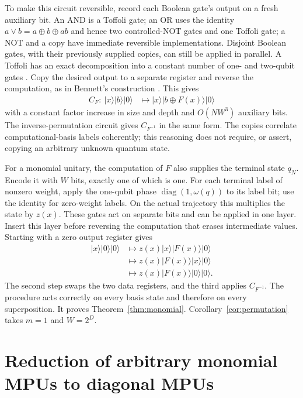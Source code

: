 \documentclass[11pt]{article}
\begin{document}
To make this circuit reversible, record each Boolean gate's output on a
fresh auxiliary bit. An AND is a Toffoli gate; an OR uses the identity
$a\lor b=a\oplus b\oplus ab$ and hence two controlled-NOT gates and one
Toffoli gate; a NOT and a copy have immediate reversible implementations.
Disjoint Boolean gates, with their previously supplied copies, can still
be applied in parallel. A Toffoli has an exact decomposition into a constant
number of one- and two-qubit gates \cite{Barenco95}.
Copy the desired output to a separate register and reverse the computation,
as in Bennett's construction \cite{Bennett73}. This gives
\begin{align}
 C_F:\ |x\rangle|b\rangle|0\rangle
 &\longmapsto |x\rangle|b\oplus F(x)\rangle|0\rangle
 \label{eq:reversible}
\end{align}
with a constant factor increase in size and depth and $O(NW^3)$ auxiliary
bits. The inverse-permutation circuit gives $C_{F^{-1}}$ in the same form.
The copies correlate computational-basis labels coherently; this reasoning
does not require, or assert, copying an arbitrary unknown quantum state.

For a monomial unitary, the computation of $F$ also supplies the terminal
state $q_N$. Encode it with $W$ bits, exactly one of which is one. For each
terminal label of nonzero weight, apply the one-qubit phase
$\operatorname{diag}(1,\omega(q))$ to its label bit; use the identity for
zero-weight labels. On the actual trajectory this multiplies the state by
$z(x)$. These gates act on separate bits and can be applied in one layer.
Insert this layer before reversing the computation that erases intermediate
values. Starting with a zero output register gives
\begin{align}
 |x\rangle|0\rangle|0\rangle
 &\longmapsto z(x)|x\rangle|F(x)\rangle|0\rangle\\
 &\longmapsto z(x)|F(x)\rangle|x\rangle|0\rangle\\
 &\longmapsto z(x)|F(x)\rangle|0\rangle|0\rangle.
 \label{eq:clean}
\end{align}
The second step swaps the two data registers, and the third applies
$C_{F^{-1}}$. The procedure acts correctly on every basis state and therefore
on every superposition. It proves Theorem~\ref{thm:monomial}.
Corollary~\ref{cor:permutation} takes $m=1$ and $W=2^D$.

\section{Reduction of arbitrary monomial MPUs to diagonal MPUs}
\end{document}
